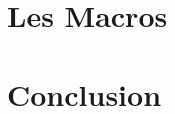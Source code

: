 \documentclass[french]{article}
\begin{document}
\section{Les Macros}

\section{Conclusion}
\end{document}
